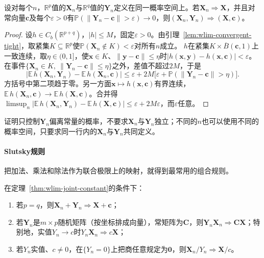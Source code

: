 \begin{theorem}[与常数配对的联合极限]
\label{thm:wlim-joint-constant}
设对每个$n$，$\mathbb R^p$值的$\bm X_n$与$\mathbb R^q$值的$\bm Y_n$定义在同一概率空间上。若$\bm X_n\Rightarrow\bm X$，并且对常向量$\bm c$及每个$\varepsilon>0$有$\mathbb P(\lVert\bm Y_n-\bm c\rVert>\varepsilon)\to0$，则$(\bm X_n,\bm Y_n)\Rightarrow(\bm X,\bm c)$。
\end{theorem}

\begin{proof}
设$h\in C_b(\mathbb R^{p+q})$，$|h|\leq M$，固定$\varepsilon>0$。由引理~\ref{lem:wlim-convergent-tight}，取紧集$K\subseteq\mathbb R^p$使$\mathbb P(\bm X_n\notin K)<\varepsilon$对所有$n$成立。
$h$在紧集$K\times\overline B(\bm c,1)$上一致连续，取$\eta\in(0,1]$，使$\bm x\in K$、$\lVert\bm y-\bm c\rVert\leq\eta$时$|h(\bm x,\bm y)-h(\bm x,\bm c)|<\varepsilon$。在事件$\{\bm X_n\in K,\ \lVert\bm Y_n-\bm c\rVert\leq\eta\}$之外，差值不超过$2M$，于是
\[
  \bigl|\mathbb E\,h(\bm X_n,\bm Y_n)-\mathbb E\,h(\bm X_n,\bm c)\bigr|\leq\varepsilon+2M\bigl[\varepsilon+\mathbb P(\lVert\bm Y_n-\bm c\rVert>\eta)\bigr].
\]
方括号中第二项趋于零。另一方面$\bm x\mapsto h(\bm x,\bm c)$有界连续，$\mathbb E\,h(\bm X_n,\bm c)\to\mathbb E\,h(\bm X,\bm c)$。合并得$\limsup_n|\mathbb E\,h(\bm X_n,\bm Y_n)-\mathbb E\,h(\bm X,\bm c)|\leq\varepsilon+2M\varepsilon$，而$\varepsilon$任意。
\end{proof}

证明只控制$\bm Y_n$偏离常量的概率，不要求$\bm X_n$与$\bm Y_n$独立；不同的$n$也可以使用不同的概率空间，只要求同一行内的$\bm X_n$与$\bm Y_n$共同定义。

\paragraph{Slutsky规则}
把加法、乘法和除法作为联合极限上的映射，就得到最常用的组合规则。

\begin{theorem}
\label{thm:wlim-slutsky}
在定理~\ref{thm:wlim-joint-constant}的条件下：
\begin{enumerate}
  \item 若$p=q$，则$\bm X_n+\bm Y_n\Rightarrow\bm X+\bm c$；
  \item 若$\bm Y_n$是$m\times p$随机矩阵（按坐标排成向量），常矩阵为$\bm C$，则$\bm Y_n\bm X_n\Rightarrow\bm C\bm X$；特别地，实值$Y_n\to c$时$Y_n\bm X_n\Rightarrow c\bm X$；
  \item 若$Y_n$实值、$c\neq0$，在$\{Y_n=0\}$上把商任意规定为$\bm 0$，则$\bm X_n/Y_n\Rightarrow\bm X/c$。
\end{enumerate}
\end{theorem}

